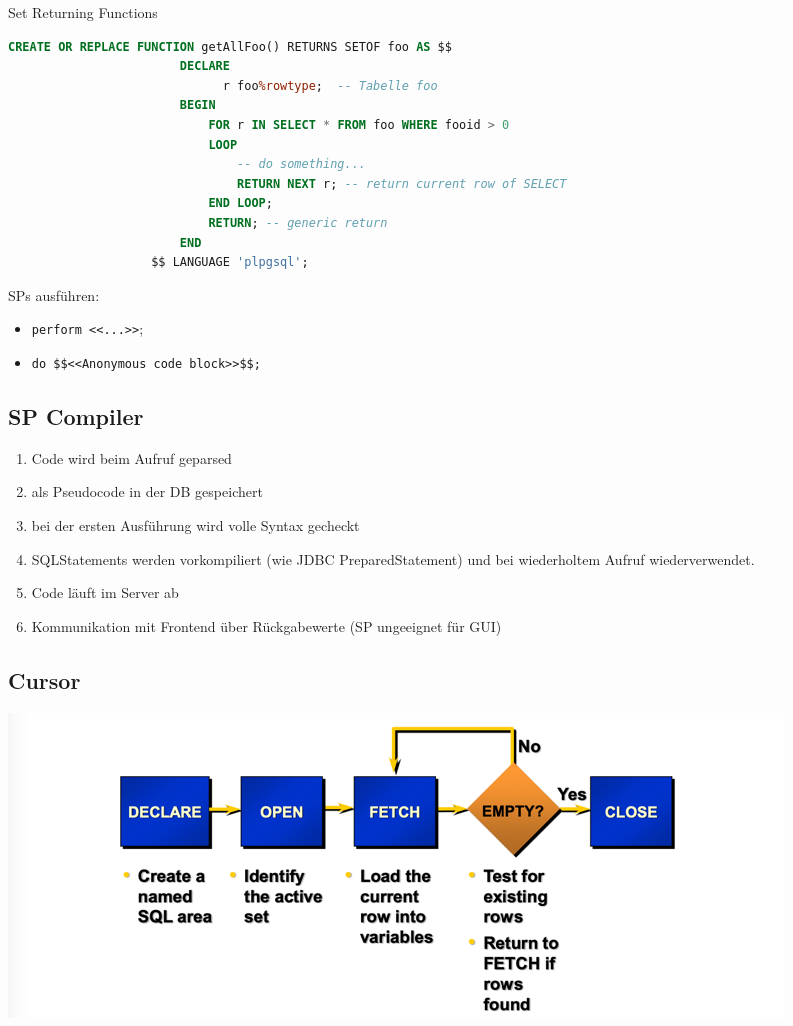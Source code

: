 \documentclass[a4paper, landscape, 8pt]{scrartcl}
\begin{document}
\begin{multicols*}{4}
        Set Returning Functions \\
        \begin{lstlisting}[language=sql]
                    CREATE OR REPLACE FUNCTION getAllFoo() RETURNS SETOF foo AS $$
                        DECLARE
                              r foo%rowtype;  -- Tabelle foo
                        BEGIN
                            FOR r IN SELECT * FROM foo WHERE fooid > 0
                            LOOP
                                -- do something...
                                RETURN NEXT r; -- return current row of SELECT
                            END LOOP;
                            RETURN; -- generic return
                        END
                    $$ LANGUAGE 'plpgsql';
        \end{lstlisting}

        SPs ausführen:
        \begin{itemize}
            \item \texttt{perform <<...>>};
            \item \texttt{do \$\$<<Anonymous code block>>\$\$;}
        \end{itemize}

        \subsection{SP Compiler}
        \begin{enumerate}
            \item Code wird beim Aufruf geparsed
            \item als Pseudocode in der DB gespeichert
            \item bei der ersten Ausführung wird volle Syntax gecheckt
            \item SQLStatements werden vorkompiliert (wie JDBC PreparedStatement) und bei wiederholtem Aufruf wiederverwendet.
            \item Code läuft im Server ab
            \item Kommunikation mit Frontend über Rückgabewerte (SP ungeeignet für GUI)
        \end{enumerate}

        \subsection{Cursor}
        \includegraphics[width=\columnwidth]{graphic/15-cursor-process}


\end{multicols*}
\end{document}
